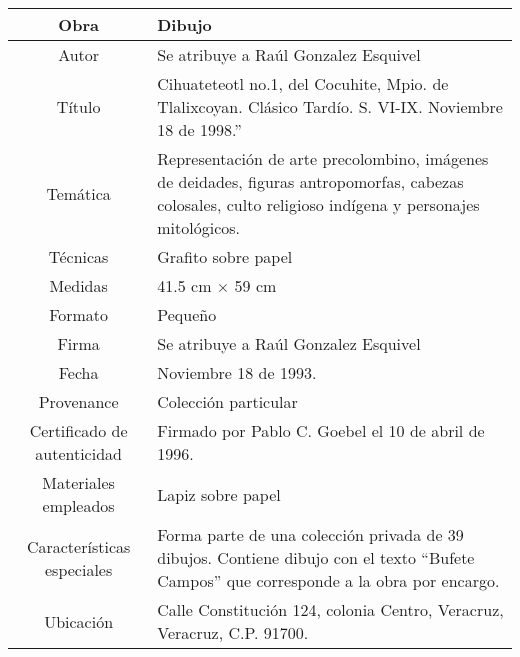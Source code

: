 \documentclass[10pt,letter]{report}
\begin{document}
\begin{table}[H]
\centering
\begin{tabular}{|c|m{}|}
\hline
Obra& Dibujo	\\
\hline
Autor & Se atribuye a Ra\'ul Gonzalez Esquivel\\
\hline
T\'itulo & Cihuateteotl no.1, del Cocuhite, Mpio. de Tlalixcoyan. Cl\'asico Tard\'io. S. VI-IX. Noviembre 18 de 1998.''\\
\hline
Tem\'atica & Representaci\'on de arte precolombino, im\'agenes de deidades, figuras antropomorfas, cabezas colosales, culto religioso ind\'igena y personajes mitol\'ogicos.\\
\hline
T\'ecnicas &Grafito sobre papel \\
\hline
Medidas & 41.5 cm $\times$ 59 cm \\
\hline
 Formato & Peque\~no \\
 \hline
 Firma & Se atribuye a Ra\'ul Gonzalez Esquivel\\ 
 \hline
  Fecha & Noviembre 18 de 1993.\\
 \hline
 Provenance & Colecci\'on particular\\
 \hline
 Certificado de autenticidad& Firmado por Pablo C. Goebel el 10 de abril de 1996.  \\
 \hline 
  Materiales empleados & Lapiz sobre papel\\
 \hline
 Caracter\'isticas especiales & Forma parte de una colecci\'on privada de 39 dibujos. 
Contiene dibujo con el texto ``Bufete Campos'' que corresponde a la obra por encargo. \\
\hline 
Ubicaci\'on & Calle Constituci\'on 124, colonia Centro, Veracruz, Veracruz, C.P. 91700.\\
\hline

\end{tabular}
\end{table}
\end{document}
